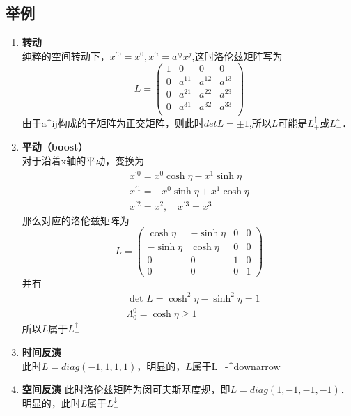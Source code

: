 \subsection{举例}
\begin{enumerate}
\item \textbf{转动}\\
纯粹的空间转动下，$x^{\prime 0}=x^{0}, x^{\prime i}=a^{i j} x^{j}$,这时洛伦兹矩阵写为\\
\begin{equation}       %
L=\left(                 %
  \begin{array}{cccc}   %
   1& 0 & 0 & 0\\  %
   0& a^{11} &  a^{12} &  a^{13}\\  %
   0& a^{21} &  a^{22} &  a^{23}\\  %
   0& a^{31} &  a^{32} &  a^{33}\\  %
  \end{array}
\right)                 %
\end{equation}
由于a^{ij}构成的子矩阵为正交矩阵，则此时$detL=\pm1$,所以$L$可能是$L_{+}^{\uparrow}$或$L_{-}^{\uparrow}$．
\item \textbf{平动（boost）}\\
对于沿着x轴的平动，变换为\\
\begin{equation}\begin{array}{c}
x^{\prime 0}=x^{0} \cosh \eta-x^{1} \sinh \eta \\
x^{\prime 1}=-x^{0} \sinh \eta+x^{1} \cosh \eta \\
x^{\prime 2}=x^{2}, \quad x^{\prime 3}=x^{3}
\end{array}\end{equation}
那么对应的洛伦兹矩阵为\\
\begin{equation}L=\left(\begin{array}{cccc}
\cosh \eta & -\sinh \eta & 0 & 0 \\
-\sinh \eta & \cosh \eta & 0 & 0 \\
0 & 0 & 1 & 0 \\
0 & 0 & 0 & 1
\end{array}\right)\end{equation}
并有\\
\begin{equation}\begin{aligned}
&\text { det } L=\cosh ^{2} \eta-\sinh ^{2} \eta=1\\
&\Lambda_{0}^{0}=\cosh \eta \geqslant 1
\end{aligned}\end{equation}
所以$L$属于$L_{+}^{\uparrow}$
\item \textbf{时间反演}\\
此时$L=diag(-1,1,1,1)$，明显的，$L$属于L_{-}^{downarrow}
\item \textbf{空间反演}
此时洛伦兹矩阵为闵可夫斯基度规，即$L=diag(1,-1,-1,-1)$．明显的，此时$L$属于$L_{+}^{\downarrow}$
\end{enumerate}
